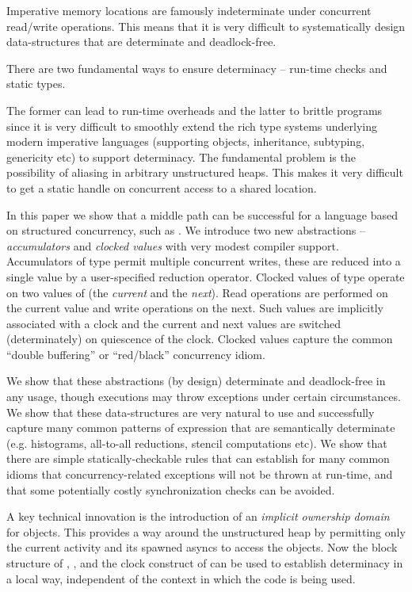 Imperative memory locations are famously indeterminate under
concurrent read/write operations. This means that it is very difficult
to systematically design data-structures that are determinate and
deadlock-free.

There are two fundamental ways to ensure determinacy -- run-time
checks and static types. 

The former can lead to run-time overheads and the latter to brittle
programs since it is very difficult to smoothly extend the rich type
systems underlying modern imperative languages (supporting objects,
inheritance, subtyping, genericity etc) to support determinacy. The
fundamental problem is the possibility of aliasing in arbitrary
unstructured heaps. This makes it very difficult to get a static
handle on concurrent access to a shared location.

In this paper we show that a middle path can be successful for a
language based on structured concurrency, such as \Xten.  We introduce
two new abstractions -- {\em accumulators} and {\em clocked values}
with very modest compiler support. Accumulators of type 
permit multiple concurrent writes, these are reduced into a single
value by a user-specified reduction operator. Clocked values of type
 operate on two values of  (the {\em current} and the
     {\em next}). Read operations are performed on the current value
     and write operations on the next. Such values are implicitly
     associated with a clock \cite{vj-radha-x10} and the current and
     next values are switched (determinately) on quiescence of the
     clock. Clocked values capture the common ``double buffering'' or
     ``red/black'' concurrency idiom.

We show that these abstractions (by design) determinate and
deadlock-free in any usage, though executions may throw exceptions
under certain circumstances. We show that these data-structures are
very natural to use and successfully capture many common patterns of
expression that are semantically determinate (e.g. histograms,
all-to-all reductions, stencil computations etc). We show that there
are simple statically-checkable rules that can establish for many
common idioms that concurrency-related exceptions will not be thrown
at run-time, and that some potentially costly synchronization checks
can be avoided.

A key technical innovation is the introduction of an {\em implicit
  ownership domain} for objects. This provides a way around the
unstructured heap by permitting only the current activity and its
spawned asyncs to access the objects. Now the block structure of
, ,  and the clock construct of
\Xten{} can be used to establish determinacy in a local way,
independent of the context in which the code is being used. 

